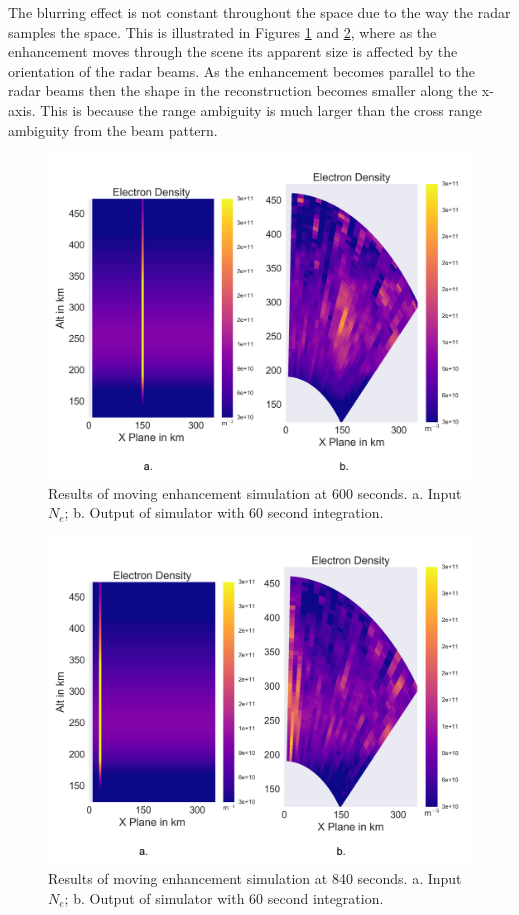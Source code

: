 \documentclass[draft,ras]{agutex}
\begin{document}
\begin{article}
The blurring effect is not constant throughout the space due to the way the radar samples the space. This is illustrated in Figures \ref{fig:moving10mins} and \ref{fig:moving14mins}, where as the enhancement moves through the scene its apparent size is affected by the orientation of the radar beams. As the enhancement becomes parallel to the radar beams then the shape in the reconstruction becomes smaller along the x-axis. This is because the range ambiguity is much larger than the cross range ambiguity from the beam pattern.

\begin{figure}[!t]
\centering
\includegraphics[width=5in]{moving6mins}
\caption{Results of moving enhancement simulation at 600 seconds. a. Input $N_e$; b. Output of simulator with 60 second integration.}
\label{fig:moving10mins}
\end{figure}


\begin{figure}[!t]
\centering
\includegraphics[width=5in]{moving14mins}
\caption{Results of moving enhancement simulation at 840 seconds. a. Input $N_e$; b. Output of simulator with 60 second integration.}
\label{fig:moving14mins}
\end{figure}


\end{article}
\end{document}
